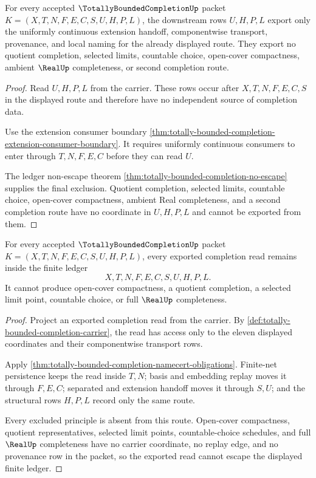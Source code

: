 \begin{theorem}
\label{thm:totally-bounded-completion-root-extension-nonescape}
For every accepted $\TotallyBoundedCompletionUp$ packet $K=(X,T,N,F,E,C,S,U,H,P,L)$, the downstream rows $U,H,P,L$ export only the uniformly continuous extension handoff, componentwise transport, provenance, and local naming for the already displayed route. They export no quotient completion, selected limits, countable choice, open-cover compactness, ambient $\RealUp$ completeness, or second completion route.
\end{theorem}
\begin{proof}
Read $U,H,P,L$ from the carrier. These rows occur after $X,T,N,F,E,C,S$ in the displayed route and therefore have no independent source of completion data.

Use the extension consumer boundary \autoref{thm:totally-bounded-completion-extension-consumer-boundary}. It requires uniformly continuous consumers to enter through $T,N,F,E,C$ before they can read $U$.

The ledger non-escape theorem \autoref{thm:totally-bounded-completion-no-escape} supplies the final exclusion. Quotient completion, selected limits, countable choice, open-cover compactness, ambient Real completeness, and a second completion route have no coordinate in $U,H,P,L$ and cannot be exported from them.
\end{proof}

\begin{theorem}
\label{thm:totally-bounded-completion-no-escape}
For every accepted $\TotallyBoundedCompletionUp$ packet $K=(X,T,N,F,E,C,S,U,H,P,L)$, every exported completion read remains inside the finite ledger
$$
X,T,N,F,E,C,S,U,H,P,L .
$$
It cannot produce open-cover compactness, a quotient completion, a selected limit point, countable choice, or full $\RealUp$ completeness.
\end{theorem}
\begin{proof}
Project an exported completion read from the carrier. By \autoref{def:totally-bounded-completion-carrier}, the read has access only to the eleven displayed coordinates and their componentwise transport rows.

Apply \autoref{thm:totally-bounded-completion-namecert-obligations}. Finite-net persistence keeps the read inside $T,N$; basis and embedding replay moves it through $F,E,C$; separated and extension handoff moves it through $S,U$; and the structural rows $H,P,L$ record only the same route.

Every excluded principle is absent from this route. Open-cover compactness, quotient representatives, selected limit points, countable-choice schedules, and full $\RealUp$ completeness have no carrier coordinate, no replay edge, and no provenance row in the packet, so the exported read cannot escape the displayed finite ledger.
\end{proof}

